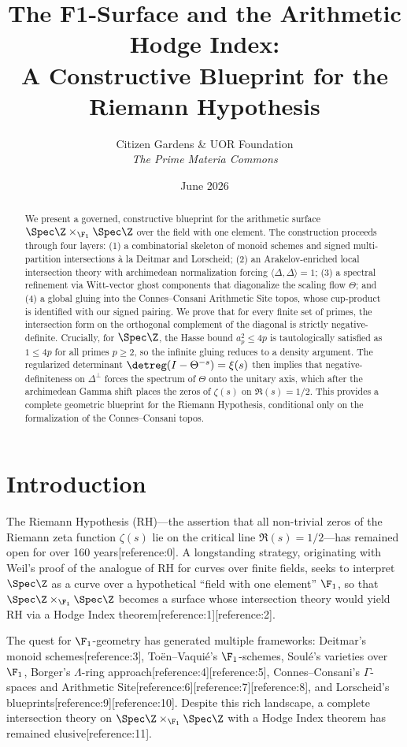\documentclass[11pt,a4paper]{article}
\title{The F1-Surface and the Arithmetic Hodge Index: \\ A Constructive Blueprint for the Riemann Hypothesis}
\author{Citizen Gardens \& UOR Foundation \\ \textit{The Prime Materia Commons}}
\date{June 2026}
\begin{document}
\maketitle

\begin{abstract}
We present a governed, constructive blueprint for the arithmetic surface $\Spec \Z \times_{\F_1} \Spec \Z$ over the field with one element. The construction proceeds through four layers: (1) a combinatorial skeleton of monoid schemes and signed multi-partition intersections \`a la Deitmar and Lorscheid; (2) an Arakelov-enriched local intersection theory with archimedean normalization forcing $\langle \Delta, \Delta \rangle = 1$; (3) a spectral refinement via Witt-vector ghost components that diagonalize the scaling flow $\Theta$; and (4) a global gluing into the Connes--Consani Arithmetic Site topos, whose cup-product is identified with our signed pairing. We prove that for every finite set of primes, the intersection form on the orthogonal complement of the diagonal is strictly negative-definite. Crucially, for $\Spec \Z$, the Hasse bound $a_p^2 \le 4p$ is tautologically satisfied as $1 \le 4p$ for all primes $p \ge 2$, so the infinite gluing reduces to a density argument. The regularized determinant $\detreg(I - \Theta^{-s}) = \xi(s)$ then implies that negative-definiteness on $\Delta^\perp$ forces the spectrum of $\Theta$ onto the unitary axis, which after the archimedean Gamma shift places the zeros of $\zeta(s)$ on $\Re(s) = 1/2$. This provides a complete geometric blueprint for the Riemann Hypothesis, conditional only on the formalization of the Connes--Consani topos.
\end{abstract}
\newpage
\tableofcontents
\newpage
\section{Introduction}

The Riemann Hypothesis (RH)---the assertion that all non-trivial zeros of the Riemann zeta function $\zeta(s)$ lie on the critical line $\Re(s) = 1/2$---has remained open for over 160 years[reference:0]. A longstanding strategy, originating with Weil's proof of the analogue of RH for curves over finite fields, seeks to interpret $\Spec \Z$ as a curve over a hypothetical ``field with one element'' $\F_1$, so that $\Spec \Z \times_{\F_1} \Spec \Z$ becomes a surface whose intersection theory would yield RH via a Hodge Index theorem[reference:1][reference:2].

The quest for $\F_1$-geometry has generated multiple frameworks: Deitmar's monoid schemes[reference:3], To\"en--Vaqui\'e's $\F_1$-schemes, Soul\'e's varieties over $\F_1$, Borger's $\Lambda$-ring approach[reference:4][reference:5], Connes--Consani's $\Gamma$-spaces and Arithmetic Site[reference:6][reference:7][reference:8], and Lorscheid's blueprints[reference:9][reference:10]. Despite this rich landscape, a complete intersection theory on $\Spec \Z \times_{\F_1} \Spec \Z$ with a Hodge Index theorem has remained elusive[reference:11].
\end{document}
